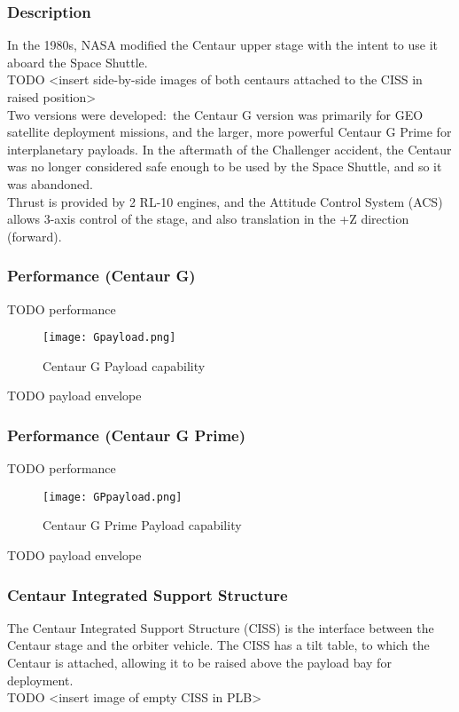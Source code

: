 \documentclass[Space_Shuttle_Ultra_Manual.tex]{subfiles}
\begin{document}
\begin{multicols*}{2}
\renewcommand{\cfttoctitlefont}{\bf}
\localtableofcontents
\subsubsection{Description}
\noindent
In the 1980s, NASA modified the Centaur upper stage with the intent to use it aboard the Space Shuttle.
\\
TODO <insert side-by-side images of both centaurs attached to the CISS in raised position>
\\
Two versions were developed$\colon$ the Centaur G version was primarily for GEO satellite deployment missions, and the larger, more powerful Centaur G Prime for interplanetary payloads. In the aftermath of the Challenger accident, the Centaur was no longer considered safe enough to be used by the Space Shuttle, and so it was abandoned.
\\
Thrust is provided by 2 RL-10 engines, and the Attitude Control System (ACS) allows 3-axis control of the stage, and also translation in the +Z direction (forward).

\subsubsection{Performance (Centaur G)}
TODO performance
\begin{figure}[H]
  \texttt{[image: Gpayload.png]}
  \caption{Centaur G Payload capability}
  \label{fig:Gpayload}
\end{figure}

TODO payload envelope

\subsubsection{Performance (Centaur G Prime)}
TODO performance
\begin{figure}[H]
  \texttt{[image: GPpayload.png]}
  \caption{Centaur G Prime Payload capability}
  \label{fig:GPpayload}
\end{figure}

TODO payload envelope

\subsubsection{Centaur Integrated Support Structure}
The Centaur Integrated Support Structure (CISS) is the interface between the Centaur stage and the orbiter vehicle. The CISS has a tilt table, to which the Centaur is attached, allowing it to be raised above the payload bay for deployment.
\\
TODO <insert image of empty CISS in PLB>


\end{multicols*}
\end{document}
